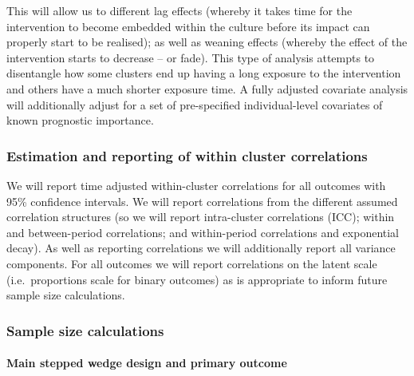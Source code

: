 \documentclass[
]{scrartcl}
\let\oldparagraph\paragraph
\renewcommand{\paragraph}[1]{\oldparagraph{#1}\mbox{}}
\begin{document}
This will allow us to different lag effects (whereby it takes time for
the intervention to become embedded within the culture before its impact
can properly start to be realised); as well as weaning effects (whereby
the effect of the intervention starts to decrease -- or fade). This type
of analysis attempts to disentangle how some clusters end up having a
long exposure to the intervention and others have a much shorter
exposure time. A fully adjusted covariate analysis will additionally
adjust for a set of pre-specified individual-level covariates of known
prognostic importance.

\hypertarget{estimation-and-reporting-of-within-cluster-correlations}{%
\subsubsection{Estimation and reporting of within cluster
correlations}\label{estimation-and-reporting-of-within-cluster-correlations}}

We will report time adjusted within-cluster correlations for all
outcomes with 95\% confidence intervals. We will report correlations
from the different assumed correlation structures (so we will report
intra-cluster correlations (ICC); within and between-period
correlations; and within-period correlations and exponential decay). As
well as reporting correlations we will additionally report all variance
components. For all outcomes we will report correlations on the latent
scale (i.e.~proportions scale for binary outcomes) as is appropriate to
inform future sample size calculations.

\hypertarget{sample-size-calculations}{%
\subsubsection{Sample size
calculations}\label{sample-size-calculations}}

\hypertarget{main-stepped-wedge-design-and-primary-outcome}{%
\paragraph{Main stepped wedge design and primary
outcome}\label{main-stepped-wedge-design-and-primary-outcome}}
\end{document}
